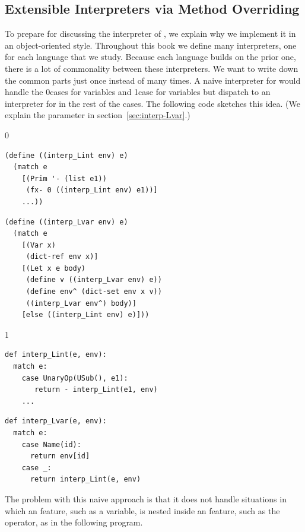 \documentclass[7x10]{TimesAPriori_MIT}%
\def\racketEd{0}
\def\pythonEd{1}
\def\edition{1}
\newcommand{\racket}[1]{{\if\edition\racketEd{#1}\fi}}
\newcommand{\pythonColor}[0]{}
\newcommand{\python}[1]{{\if\edition\pythonEd\pythonColor #1\fi}}
\numberwithin{theorem}{chapter}
\numberwithin{definition}{chapter}
\numberwithin{equation}{chapter}
\begin{document}
\subsection{Extensible Interpreters via Method Overriding}
\label{sec:extensible-interp}

To prepare for discussing the interpreter of \LangVar{}, we explain
why we implement it in an object-oriented style. Throughout this book
we define many interpreters, one for each language that we
study. Because each language builds on the prior one, there is a lot
of commonality between these interpreters. We want to write down the
common parts just once instead of many times. A naive interpreter for
\LangVar{} would handle the \racket{cases for variables and
  } \python{case for variables} but dispatch to an
interpreter for \LangInt{} in the rest of the cases. The following
code sketches this idea. (We explain the  parameter in
section~\ref{sec:interp-Lvar}.)

\begin{center}
{\if\edition\racketEd  
\begin{minipage}{0.45\textwidth}
\begin{lstlisting}
(define ((interp_Lint env) e)
  (match e
    [(Prim '- (list e1))
     (fx- 0 ((interp_Lint env) e1))]
    ...))
\end{lstlisting}
\end{minipage}
\begin{minipage}{0.45\textwidth}
  \begin{lstlisting}
(define ((interp_Lvar env) e)
  (match e
    [(Var x)
     (dict-ref env x)]
    [(Let x e body)
     (define v ((interp_Lvar env) e))
     (define env^ (dict-set env x v))
     ((interp_Lvar env^) body)]
    [else ((interp_Lint env) e)]))    
\end{lstlisting}
\end{minipage}
\fi}

{\if\edition\pythonEd\pythonColor
\begin{minipage}{0.45\textwidth}
\begin{lstlisting}
def interp_Lint(e, env):
  match e:
    case UnaryOp(USub(), e1):
       return - interp_Lint(e1, env)
    ...
\end{lstlisting}
\end{minipage}
\begin{minipage}{0.45\textwidth}
\begin{lstlisting}
def interp_Lvar(e, env):
  match e:
    case Name(id):
      return env[id]
    case _:
      return interp_Lint(e, env)
\end{lstlisting}
\end{minipage}
\fi}
\end{center}
The problem with this naive approach is that it does not handle
situations in which an \LangVar{} feature, such as a variable, is
nested inside an \LangInt{} feature, such as the \code{-} operator, as
in the following program.
\end{document}
